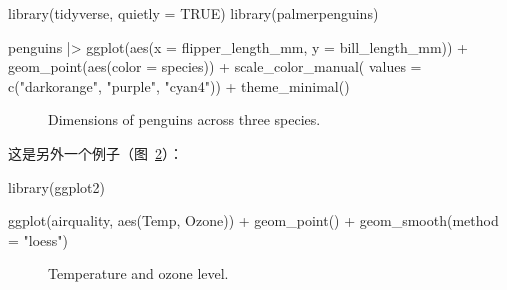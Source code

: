 \documentclass[
  1.2em,
  letterpaper,
]{scrbook}
\newenvironment{Shaded}{\begin{snugshade}}{\end{snugshade}}
\newcommand{\AttributeTok}[1]{\textcolor[rgb]{0.40,0.45,0.13}{#1}}
\newcommand{\ConstantTok}[1]{\textcolor[rgb]{0.56,0.35,0.01}{#1}}
\newcommand{\FunctionTok}[1]{\textcolor[rgb]{0.28,0.35,0.67}{#1}}
\newcommand{\NormalTok}[1]{\textcolor[rgb]{0.00,0.23,0.31}{#1}}
\newcommand{\SpecialCharTok}[1]{\textcolor[rgb]{0.37,0.37,0.37}{#1}}
\newcommand{\StringTok}[1]{\textcolor[rgb]{0.13,0.47,0.30}{#1}}
\begin{document}
\begin{Shaded}
\begin{Highlighting}[]
\FunctionTok{library}\NormalTok{(tidyverse, }\AttributeTok{quietly =} \ConstantTok{TRUE}\NormalTok{)}
\FunctionTok{library}\NormalTok{(palmerpenguins)}

\NormalTok{penguins }\SpecialCharTok{|\textgreater{}}
  \FunctionTok{ggplot}\NormalTok{(}\FunctionTok{aes}\NormalTok{(}\AttributeTok{x =}\NormalTok{ flipper\_length\_mm, }\AttributeTok{y =}\NormalTok{ bill\_length\_mm)) }\SpecialCharTok{+}
  \FunctionTok{geom\_point}\NormalTok{(}\FunctionTok{aes}\NormalTok{(}\AttributeTok{color =}\NormalTok{ species)) }\SpecialCharTok{+}
  \FunctionTok{scale\_color\_manual}\NormalTok{(}
    \AttributeTok{values =} \FunctionTok{c}\NormalTok{(}\StringTok{"darkorange"}\NormalTok{, }\StringTok{"purple"}\NormalTok{, }\StringTok{"cyan4"}\NormalTok{)) }\SpecialCharTok{+}
  \FunctionTok{theme\_minimal}\NormalTok{()}
\end{Highlighting}
\end{Shaded}

\begin{figure}[H]


\caption{\label{fig-penguins}Dimensions of penguins across three
species.}

\end{figure}%

这是另外一个例子（图~\ref{fig-airquality}）：

\begin{Shaded}
\begin{Highlighting}[]
\FunctionTok{library}\NormalTok{(ggplot2)}

\FunctionTok{ggplot}\NormalTok{(airquality, }\FunctionTok{aes}\NormalTok{(Temp, Ozone)) }\SpecialCharTok{+} 
  \FunctionTok{geom\_point}\NormalTok{() }\SpecialCharTok{+} 
  \FunctionTok{geom\_smooth}\NormalTok{(}\AttributeTok{method =} \StringTok{"loess"}\NormalTok{)}
\end{Highlighting}
\end{Shaded}

\begin{figure}[H]


\caption{\label{fig-airquality}Temperature and ozone level.}

\end{figure}%
\end{document}
